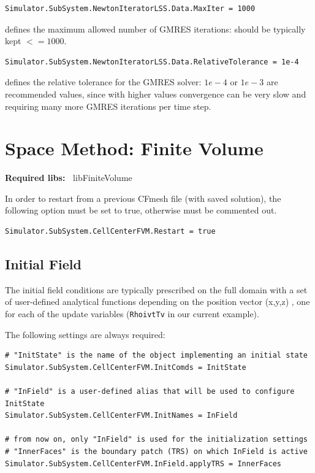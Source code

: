 \documentclass[11pt]{article}
\begin{document}
\begin{lstlisting}[breaklines]
Simulator.SubSystem.NewtonIteratorLSS.Data.MaxIter = 1000
\end{lstlisting}
defines the maximum allowed number of GMRES iterations: should be typically kept $<= 1000$.

\begin{lstlisting}[breaklines]
Simulator.SubSystem.NewtonIteratorLSS.Data.RelativeTolerance = 1e-4
\end{lstlisting}
defines the relative tolerance for the GMRES solver: $1e-4$ or $1e-3$ are recommended values, since with higher values 
convergence can be very slow and requiring many more GMRES iterations per time step.

\section{Space Method: Finite Volume}

{\bf Required libs:~} libFiniteVolume

In order to restart from a previous CFmesh file (with saved solution), the following option must be set to true, 
otherwise must be commented out.
\begin{lstlisting}[breaklines]
Simulator.SubSystem.CellCenterFVM.Restart = true
\end{lstlisting}

\subsection{Initial Field}

The initial field conditions are typically prescribed on the full domain with a set of 
user-defined analytical functions depending on the position vector (x,y,z) \cite{FParser}, 
one for each of the update variables ({\tt RhoivtTv} in our current example). 

The following settings are always required:
\begin{lstlisting}[breaklines]
# "InitState" is the name of the object implementing an initial state 
Simulator.SubSystem.CellCenterFVM.InitComds = InitState

# "InField" is a user-defined alias that will be used to configure InitState
Simulator.SubSystem.CellCenterFVM.InitNames = InField

# from now on, only "InField" is used for the initialization settings
# "InnerFaces" is the boundary patch (TRS) on which InField is active
Simulator.SubSystem.CellCenterFVM.InField.applyTRS = InnerFaces
\end{lstlisting}
\end{document}
